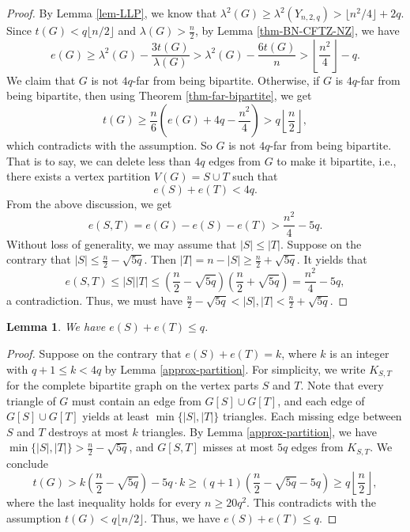 \documentclass[11pt]{article}
\newtheorem{lemma}[theorem]{Lemma}
\begin{document}
 \begin{proof}
By Lemma \ref{lem-LLP}, 
 we know  that $\lambda^2 (G) \ge \lambda^2 (Y_{n,2,q})> \lfloor n^2/4\rfloor +2q$. 
 Since $t(G)< q\lfloor {n}/{2}\rfloor$ and $\lambda (G)> \frac{n}{2}$, 
  by  Lemma \ref{thm-BN-CFTZ-NZ}, we have 
\begin{equation} \label{eq-eG}   
e(G)\ge \lambda^2(G) - \frac{3t(G)}{\lambda (G)} 
>  \lambda^2(G) - \frac{6t(G)}{n} >    
\left\lfloor \frac{n^2}{4} \right\rfloor - q . 
\end{equation}
We claim that $G$ is not $4q$-far from being bipartite. 
Otherwise, if $G$ is $4q$-far from being bipartite, 
then using Theorem \ref{thm-far-bipartite}, we get 
\[  t(G)\ge \frac{n}{6} \left(e(G) + 4q - \frac{n^2}{4} 
\right)> q \left\lfloor \frac{n}{2} \right\rfloor, \]  
which contradicts with the assumption.  
So $G$ is not $4q$-far from being bipartite. 
That is to say, we can delete less than $4q$ edges from 
$G$ to make it bipartite, i.e., 
there exists a vertex partition 
$V(G)=S\cup T$ such that 
\begin{equation*}
e(S) + e(T)< 4q. 
\end{equation*}
From the above discussion, we get 
\[  e(S,T) 
= e(G) - e(S) - e(T) >  \frac{n^2}{4} - 5q. \] 
Without loss of generality, we may assume that 
$|S| \le |T|$. 
Suppose on the contrary that $|S| \le \frac{n}{2} - \sqrt{5q}$. 
Then $|T|= n-|S| \ge \frac{n}{2} + \sqrt{5q}$. It yields that 
\[   e(S,T)\le |S| |T| \le \left(\frac{n}{2} - \sqrt{5q} \right) 
\left(\frac{n}{2} +  \sqrt{5q} \right) = \frac{n^2}{4} -5q, \] 
 a contradiction. 
Thus, we must have 
 $\frac{n}{2} - \sqrt{5q} < |S|, |T| < \frac{n}{2} +\sqrt{5q}$.  
\end{proof}



\begin{lemma} \label{lem-ST-q}
We have $e(S) + e(T)\le q$. 
\end{lemma}

\begin{proof}
Suppose on the contrary that 
$e(S) + e(T) = k$, where $k$ is an integer with $q+1\le k < 4q$ by Lemma \ref{approx-partition}.  
For simplicity, we write $K_{S,T}$ for the complete bipartite graph 
on the vertex parts $S$ and $T$. 
Note that every triangle of $G$ must contain an edge from $G[S]\cup G[T]$,  and each edge of $G[S]\cup G[T]$ yields at least $\min\{|S|,|T|\}$ triangles.  
Each missing edge between 
$S$ and $T$ destroys at most $k$ triangles. 
By Lemma \ref{approx-partition}, we have 
$\min\{|S|,|T|\} > \frac{n}{2} -\sqrt{5q}$, and 
$G[S,T]$ misses at most $5q$ edges from $K_{S,T}$. 
We conclude 
\[  t(G) > k \left(\frac{n}{2} -\sqrt{5q} \right) - 5q\cdot k
 \ge (q+1)\left( \frac{n}{2} - \sqrt{5q} -5q \right) \ge q \left\lfloor \frac{n}{2} \right\rfloor, \]   
 where the last inequality holds for every $n\ge 20q^2$. 
This contradicts with the assumption $t(G)< q \lfloor n/2\rfloor$. 
Thus, we have $e(S) + e(T)\le q$.  
\end{proof}
\end{document}

